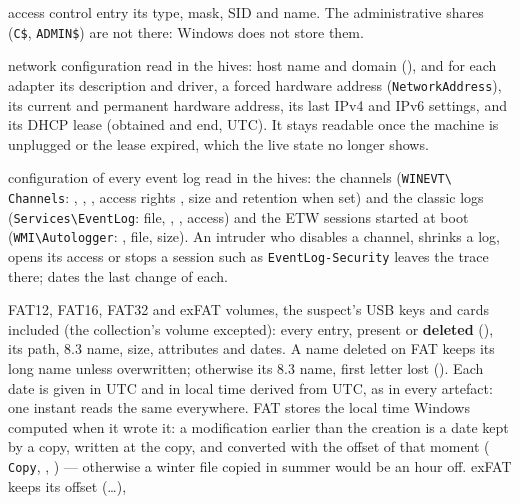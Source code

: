 \documentclass[11pt,a4paper,oneside]{report}
\begin{document}
\begin{description}[style=nextline,leftmargin=1.2em]
        access control entry its type, mask, SID and name. The administrative
        shares (\texttt{C\$}, \texttt{ADMIN\$}) are not there: Windows does not
        store them.
  \item[\fichier{network\_configuration.json}] network configuration read in
        the hives: host name and domain (), and for each adapter
        its description and driver, a forced hardware address
        (\texttt{NetworkAddress}), its current and permanent hardware address,
        its last IPv4 and IPv6 settings, and its DHCP lease (obtained and end,
        UTC). It stays readable once the machine is unplugged or the lease
        expired, which the live state no longer shows.
  \item[\fichier{event\_log\_configuration.json}] configuration of every event
        log read in the hives: the channels (\texttt{WINEVT\textbackslash
        Channels}: , , ,
        access rights , size and retention when set) and
        the classic logs (\texttt{Services\textbackslash EventLog}: file,
        , , access) and the ETW sessions
        started at boot (\texttt{WMI\textbackslash Autologger}: ,
        file, size). An intruder who disables a channel, shrinks a log, opens
        its access or stops a session such as \texttt{EventLog-Security} leaves
        the trace there;
         dates the last change of each.
  \item[\fichier{fat\_volumes.json}] FAT12, FAT16, FAT32 and exFAT volumes, the
        suspect's USB keys and cards included (the collection's volume
        excepted): every entry, present or \textbf{deleted} (),
        its path, 8.3 name, size, attributes and dates. A name deleted on FAT
        keeps its long name unless overwritten; otherwise its 8.3 name, first
        letter lost (). Each date is given in UTC and in
        local time derived from UTC, as in every artefact: one instant reads
        the same everywhere. FAT stores the local time Windows computed when it
        wrote it: a modification earlier than the creation is a date kept by a
        copy, written at the copy, and converted with the offset of that moment
        ( \texttt{Copy}, ,
        ) — otherwise a winter file copied in summer
        would be an hour off. exFAT keeps its offset (\ldots),

\end{description}
\end{document}
